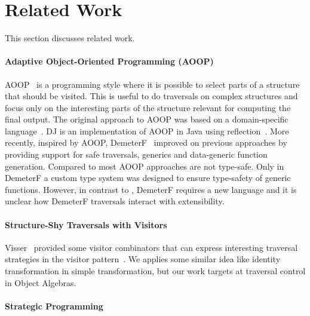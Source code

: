\section{Related Work}\label{sec:related}


This section discusses related work.

\paragraph{Adaptive Object-Oriented Programming (AOOP)}
AOOP~\cite{DemeterBook} is a programming style where it is possible to
select parts of a structure that should be visited. This is useful to
do traversals on complex structures and focus only on the interesting
parts of the structure relevant for computing the final output. The
original approach to AOOP was based on a domain-specific
language~\cite{DemeterBook}. DJ is an implementation of AOOP in Java
using reflection~\cite{DJ}. More recently, inspired by AOOP,
DemeterF~\cite{OOGP} improved on previous approaches by providing
support for safe traversals, generics and data-generic function
generation. Compared to \name most AOOP approaches are not
type-safe. Only in DemeterF a custom type system was designed to
ensure type-safety of generic functions. However, in contrast to
\Name, DemeterF requires a new language and it is unclear how DemeterF
traversals interact with extensibility.

\paragraph{Structure-Shy Traversals with Visitors}
Visser~\cite{visser01visitor} provided some visitor
combinators that can express interesting traversal strategies in the
{\sc visitor} pattern~\cite{gof}. We applies some similar idea like identity
transformation in simple transformation, but our work targets at
traversal control in Object Algebras.

\paragraph{Strategic Programming}

